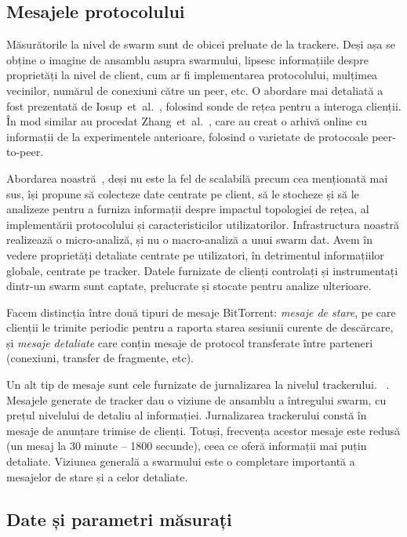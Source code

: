 \subsection{Mesajele protocolului}

Măsurătorile la nivel de swarm sunt de obicei preluate de la trackere. Deși
așa se obține o imagine de ansamblu asupra swarmului, lipsesc informațiile
despre proprietăți la nivel de client, cum ar fi implementarea protocolului,
mulțimea vecinilor, numărul de conexiuni către un peer, etc. O abordare
mai detaliată a fost prezentată de 
Iosup~et~al.~\cite{corr-overlay}, folosind sonde de rețea pentru a interoga
clienții. În mod similar au procedat
Zhang~et~al.~\cite{p2p-trace-archive}, care au creat o arhivă online cu
informații de la experimentele anterioare, folosind o varietate de protocoale
peer-to-peer.

Abordarea noastră~\cite{enhanced-logging}, deși nu este la fel de scalabilă
precum cea menționată mai sus, își propune să colecteze date centrate
pe client, să le stocheze și să le analizeze pentru a furniza informații
despre impactul topologiei de rețea, al implementării protocolului și
caracteristicilor utilizatorilor. Infrastructura noastră realizează o
micro-analiză, și nu o macro-analiză a unui swarm dat. Avem în vedere
proprietăți detaliate centrate pe utilizatori, în detrimentul informațiilor
globale, centrate pe tracker. Datele furnizate de clienți controlați și
instrumentați dintr-un swarm sunt captate, prelucrate și stocate pentru
analize ulterioare.

Facem distincția între două tipuri de mesaje BitTorrent:
\textit{mesaje de stare}, pe care clienții le trimite periodic pentru a
raporta starea sesiunii curente de descărcare, și \textit{mesaje detaliate}
care conțin mesaje de protocol transferate între parteneri (conexiuni,
transfer de fragmente, etc).

Un alt tip de mesaje sunt cele furnizate de jurnalizarea la nivelul trackerului.
~\cite{tracker-mon}. Mesajele generate de tracker dau o viziune de ansamblu a
întregului swarm, cu prețul nivelului de detaliu al informației. Jurnalizarea
trackerului constă în mesaje de anunțare trimise de clienți. Totuși,
frecvența acestor mesaje este redusă (un mesaj la 30 minute -- 1800 secunde),
ceea ce oferă informații mai puțin detaliate. Viziunea generală a swarmului
este o completare importantă a mesajelor de stare și a celor detaliate.

\subsection{Date și parametri măsurați}

